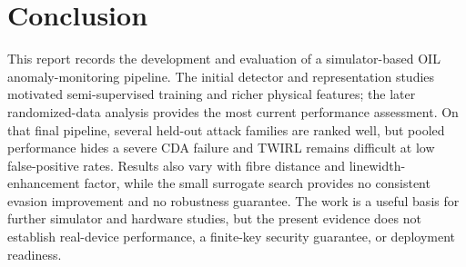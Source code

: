 \documentclass[12pt, a4paper]{report}
\begin{document}
\chapter{Conclusion}
This report records the development and evaluation of a simulator-based OIL anomaly-monitoring pipeline. The initial detector and representation studies motivated semi-supervised training and richer physical features; the later randomized-data analysis provides the most current performance assessment. On that final pipeline, several held-out attack families are ranked well, but pooled performance hides a severe CDA failure and TWIRL remains difficult at low false-positive rates. Results also vary with fibre distance and linewidth-enhancement factor, while the small surrogate search provides no consistent evasion improvement and no robustness guarantee. The work is a useful basis for further simulator and hardware studies, but the present evidence does not establish real-device performance, a finite-key security guarantee, or deployment readiness.
\end{document}
